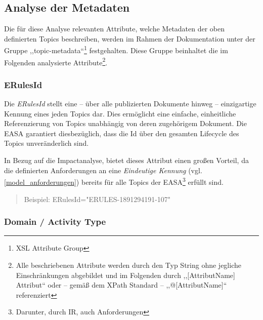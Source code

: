 \pagebreak
\subsection{Analyse der Metadaten}
\label{ch:easa_anal}

    Die für diese Analyse relevanten Attribute, welche Metadaten der oben definierten Topics beschreiben, werden im Rahmen der Dokumentation unter der Gruppe ,,\textsf{topic-metadata}``\footnote{\ac{XSL} Attribute Group} festgehalten.
    Diese Gruppe beinhaltet die im Folgenden analysierte Attribute\footnote{Alle beschriebenen Attribute werden durch den Typ String ohne jegliche Einschränkungen abgebildet und im Folgenden durch ,,[AttributName] Attribut`` oder -- gemäß dem XPath Standard -- ,,@[AttributName]`` referenziert}. \cite[9]{easa_xml_schema}

\subsubsection{ERulesId}

    Die \textit{ERulesId} stellt eine -- über alle publizierten Dokumente hinweg -- einzigartige Kennung eines jeden Topics dar.
    Dies ermöglicht eine einfache, einheitliche Referenzierung von Topics unabhängig von deren zugehörigem Dokument.
    Die \ac{EASA} garantiert diesbezüglich, dass die Id über den gesamten Lifecycle des Topics unveränderlich sind. \cite[17]{easa_xml_doc}
    
    In Bezug auf die Impactanalyse, bietet dieses Attribut einen großen Vorteil, da die definierten Anforderungen an eine \textit{Eindeutige Kennung} (vgl. \ref{model_anforderungen}) bereits für alle Topics der \ac{EASA}\footnote{Darunter, durch \ac{IR}, auch \atmans Anforderungen} erfüllt sind.
    \begin{quote}
    Beispiel:
    \textsf{ERulesId="{}ERULES-1891294191-107"}
    \end{quote}

    
\subsubsection{Domain / Activity Type}

